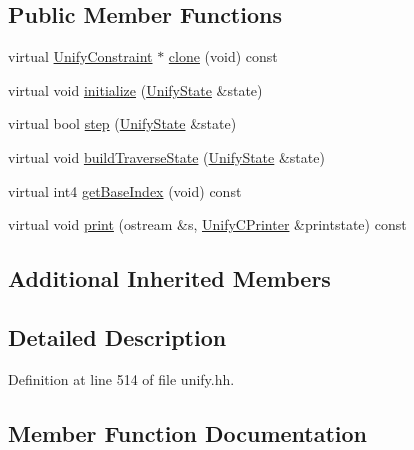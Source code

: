 \subsection*{Public Member Functions}
\begin{DoxyCompactItemize}
\item 
virtual \mbox{\hyperlink{class_unify_constraint}{Unify\+Constraint}} $\ast$ \mbox{\hyperlink{class_constraint_or_ab5e39153f8f49fe816667d0f63848dbf}{clone}} (void) const
\item 
virtual void \mbox{\hyperlink{class_constraint_or_a34e54a45768c4fa9d30fb4624529d29b}{initialize}} (\mbox{\hyperlink{class_unify_state}{Unify\+State}} \&state)
\item 
virtual bool \mbox{\hyperlink{class_constraint_or_a04ec591e6f9106bfbdbf9bf76e773aea}{step}} (\mbox{\hyperlink{class_unify_state}{Unify\+State}} \&state)
\item 
virtual void \mbox{\hyperlink{class_constraint_or_a009ca281642d6e7949ee4b997f82e3df}{build\+Traverse\+State}} (\mbox{\hyperlink{class_unify_state}{Unify\+State}} \&state)
\item 
virtual int4 \mbox{\hyperlink{class_constraint_or_a4ce164e19f57a285919eff135481dea9}{get\+Base\+Index}} (void) const
\item 
virtual void \mbox{\hyperlink{class_constraint_or_a31fc2e3e5eb05b8d279faa97532eb729}{print}} (ostream \&s, \mbox{\hyperlink{class_unify_c_printer}{Unify\+C\+Printer}} \&printstate) const
\end{DoxyCompactItemize}
\subsection*{Additional Inherited Members}


\subsection{Detailed Description}


Definition at line 514 of file unify.\+hh.



\subsection{Member Function Documentation}
\mbox{\label{class_constraint_or_a009ca281642d6e7949ee4b997f82e3df}} 

